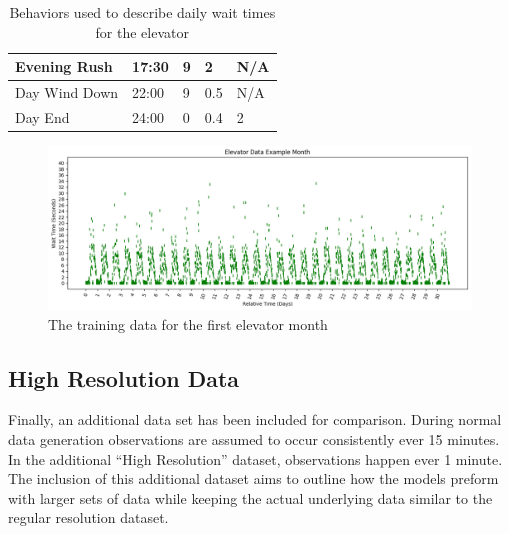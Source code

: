 \begin{table}[!htb]
\begin{tabular}{|l|l|l|l|l|}
      Evening Rush           & 17:30    & 9                                 & 2                             & N/A      \\ \hline
      Day Wind Down          & 22:00    & 9                                 & 0.5                           & N/A      \\ \hline
      Day End                & 24:00    & 0                                 & 0.4                           & 2        \\ \hline
    \end{tabular}
    \caption{Behaviors used to describe daily wait times for the elevator}
    \label{table:elevator_day_t}
  \end{table}



  \begin{figure}[!htb]
    \centering
    \includegraphics[width=\linewidth]{images/Elevator_Data_Example_Month.png}
    \caption{The training data for the first elevator month}
    \label{figure:Elevator Training Data}
  \end{figure}


  \subsection{ High Resolution Data }

  Finally, an additional data set has been included for comparison. During
  normal data generation observations are assumed to occur consistently ever
  15 minutes. In the additional ``High Resolution'' dataset, observations happen
  ever 1 minute. The inclusion of this additional dataset aims to outline how
  the models preform with larger sets of data while keeping the actual
  underlying data similar to the regular resolution dataset.


